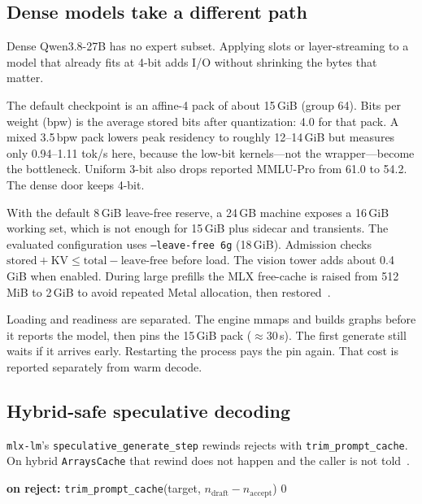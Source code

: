 \documentclass[11pt]{article}
\theoremstyle{definition}
\begin{document}
\subsection{Dense models take a different path}
\label{sec:dense}

Dense Qwen3.8-27B has no expert subset. Applying slots or layer-streaming to a model that already fits at 4-bit adds I/O without shrinking the bytes that matter.

The default checkpoint is an affine-4 pack of about 15\,GiB (group 64). Bits per weight (bpw) is the average stored bits after quantization: 4.0 for that pack. A mixed 3.5\,bpw pack lowers peak residency to roughly 12--14\,GiB but measures only 0.94--1.11 tok/s here, because the low-bit kernels---not the wrapper---become the bottleneck. Uniform 3-bit also drops reported MMLU-Pro from 61.0 to 54.2. The dense door keeps 4-bit.

With the default 8\,GiB leave-free reserve, a 24\,GB machine exposes a 16\,GiB working set, which is not enough for 15\,GiB plus sidecar and transients. The evaluated configuration uses \texttt{--leave-free 6g} (18\,GiB). Admission checks $\mathrm{stored}+\mathrm{KV}\le \mathrm{total}-\mathrm{leave\text{-}free}$ before load. The vision tower adds about 0.4\,GiB when enabled. During large prefills the MLX free-cache is raised from 512\,MiB to 2\,GiB to avoid repeated Metal allocation, then restored~\citep{mlx3350}.

Loading and readiness are separated. The engine mmaps and builds graphs before it reports the model, then pins the 15\,GiB pack (${\approx}30$\,s). The first generate still waits if it arrives early. Restarting the process pays the pin again. That cost is reported separately from warm decode.

\subsection{Hybrid-safe speculative decoding}
\label{sec:spec}

\texttt{mlx-lm}’s \texttt{speculative\_generate\_step} rewinds rejects with \texttt{trim\_prompt\_cache}. On hybrid \texttt{ArraysCache} that rewind does not happen and the caller is not told~\citep{mlxlmcache,slotbankrepo}.

\begin{algorithm}[t]
\caption{Unsafe rewind on an untrimmable hybrid cache}
\begin{algorithmic}[1]
\State \textbf{on reject:} \texttt{trim\_prompt\_cache}(target, $n_{\mathrm{draft}}-n_{\mathrm{accept}}$)
  \State \Return $0$ 
\EndIf
\end{algorithmic}
\end{algorithm}
\end{document}
